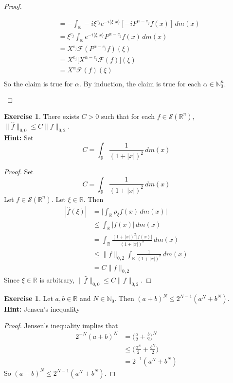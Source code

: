 \documentclass{book}
\theoremstyle{definition}
\newtheorem{ex}[definition]{Exercise}
\newcommand{\al}{\alpha}
\newcommand{\N}{\mathbb{N}}
\newcommand{\R}{\mathbb{R}}
\newcommand{\MF}{\mathcal{F}}
\newcommand{\MS}{\mathcal{S}}
\DeclareMathOperator*{\0}{\mbf{0}}
\DeclareMathOperator*{\1}{\mbf{1}}
\renewcommand{\r}{\rangle}
\renewcommand{\l}{\langle}
\newcommand{\dm}{\, d m}
\begin{document}
\begin{proof}
\begin{enumerate}
\begin{align*}
				&= - \int_{\R} -i \xi^{e_j} e^{-i \l \xi , x \r} [-iP^{\al-e_j}f(x)] \dm(x) \\
				&= \xi^{e_j} \int_{\R}   e^{-i \l \xi , x \r} P^{\al-e_j}f(x) \dm(x) \\
				&= X^{e_j} \MF(P^{\al-e_j}f)(\xi) \\
				& = X^{e_j} \bigg[ X^{\al-e_j}\MF(f) \bigg](\xi) \\
				&= X^{\al} \MF(f)(\xi) \\
			\end{align*}
			So the claim is true for $\al$. By induction, the claim is true for each $\al \in \N_0^n$.
		\end{enumerate}
	\end{proof}

	\begin{ex}
		There exists $C >0$ such that for each $f \in \MS(\R^n)$, $\|\hat{f}\|_{0,0} \leq C \|f\|_{0, 2}$.\\
		\textbf{Hint:} Set $$C = \int_{\R} \frac{1}{(1+|x|)^2} \dm(x)$$
	\end{ex}
	
	\begin{proof}
		Set 
		$$C = \int_{\R} \frac{1}{(1+|x|)^2} \dm(x)$$
		Let $f \in \MS(\R^n)$. Let $\xi \in \R$. Then 
		\begin{align*}
			|\hat{f}(\xi)| 
			& = \bigg| \int_{\R} \rho_{\xi} f(x) \dm(x) \bigg| \\
			& \leq  \int_{\R} | f(x)| \dm(x) \\
			& =  \int_{\R} \frac{(1+|x|)^2|f(x)|}{(1+|x|)^2} \dm(x) \\
			& \leq \|f\|_{0, 2} \int_{\R} \frac{1}{(1+|x|)^2} \dm(x) \\
			& = C\|f\|_{0, 2}
		\end{align*}
		Since $\xi \in \R$ is arbitrary, $\|\hat{f}\|_{0,0} \leq C\|f\|_{0, 2}$.
	\end{proof}

	\begin{ex}
		Let $a, b \in \R$ and $N \in \N_0$. Then $(a + b)^N \leq 2^{N-1} (a^N + b^N)$. \\
		\textbf{Hint:} Jensen's inequality
	\end{ex}
	
	\begin{proof}
		Jensen's inequality implies that 
		\begin{align*}
			2^{-N}(a + b)^N 
			& = \bigg(\frac{a}{2} + \frac{b}{2} \bigg)^N \\
			& \leq \bigg(\frac{a^N}{2} + \frac{b^N}{2} \bigg) \\
			& = 2^{-1}(a^N + b^N)
		\end{align*}
	So $(a + b)^N \leq 2^{N-1} (a^N + b^N)$.
	\end{proof}
\end{document}

